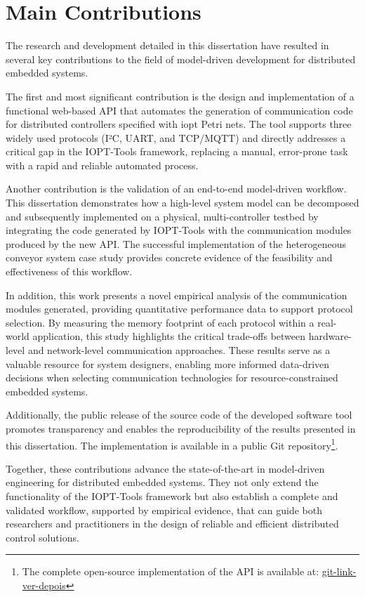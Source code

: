 \section{Main Contributions}
\label{sec:main_contributions}

The research and development detailed in this dissertation have resulted in several key contributions to the field of model-driven development for distributed embedded systems. 

The first and most significant contribution is the design and implementation of a functional web-based API that automates the generation of communication code for distributed controllers specified with \gls{iopt} Petri nets. The tool supports three widely used protocols (I²C, UART, and TCP/MQTT) and directly addresses a critical gap in the IOPT-Tools framework, replacing a manual, error-prone task with a rapid and reliable automated process.

Another contribution is the validation of an end-to-end model-driven workflow. This dissertation demonstrates how a high-level system model can be decomposed and subsequently implemented on a physical, multi-controller testbed by integrating the code generated by IOPT-Tools with the communication modules produced by the new API. The successful implementation of the heterogeneous conveyor system case study provides concrete evidence of the feasibility and effectiveness of this workflow.

In addition, this work presents a novel empirical analysis of the communication modules generated, providing quantitative performance data to support protocol selection. By measuring the memory footprint of each protocol within a real-world application, this study highlights the critical trade-offs between hardware-level and network-level communication approaches. These results serve as a valuable resource for system designers, enabling more informed data-driven decisions when selecting communication technologies for resource-constrained embedded systems.

Additionally, the public release of the source code of the developed software tool promotes transparency and enables the reproducibility of the results presented in this dissertation. The implementation is available in a public Git repository\footnote{The complete open-source implementation of the API is available at: \url{git-link-ver-depois}}.

Together, these contributions advance the state-of-the-art in model-driven engineering for distributed embedded systems. They not only extend the functionality of the IOPT-Tools framework but also establish a complete and validated workflow, supported by empirical evidence, that can guide both researchers and practitioners in the design of reliable and efficient distributed control solutions.


